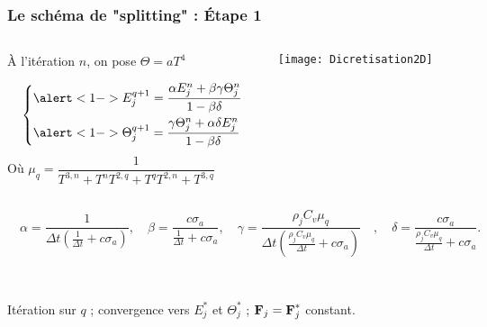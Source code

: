 \begin{frame}
  \frametitle{Le schéma de "splitting" : Étape 1}
  \begin{columns}
    \begin{column}{0.5\textwidth}
     À l'itération $n$, on pose $\Theta = aT^4$

      \begingroup
      \normalsize
      \begin{equation*} 
        \begin{dcases}
         \alert<1->{E_j^{q+1} = \dfrac{\alpha E_j^n + \beta \gamma \Theta_j^n}{1 - \beta \delta}} \\
         \alert<1->{\Theta_j^{q+1} = \dfrac{\gamma \Theta_j^n + \alpha \delta E_j^n}{1 - \beta \delta}}
        \end{dcases}
    \label{eqn:Step1}
    \end{equation*}
      \endgroup
      Où
      \tiny
      $\mu_q = \dfrac{1}{T^{3,n} + T^{n}T^{2,q} + T^{q}T^{2,n} + T^{3,q}}$
      \normalsize
    \end{column}
    \begin{column}{0.5\textwidth}
       \begin{center}
        \texttt{[image: Dicretisation2D]}       
       \end{center}
    \end{column}
   \end{columns}
   \tiny
  $\quad  \alpha = \dfrac{1}{\Delta t \left( \frac{1}{\Delta t} + c \sigma_a \right)} ,\quad 
   \beta = \dfrac{c \sigma_a}{\frac{1}{\Delta t} + c \sigma_a} ,\quad 
   \gamma = \dfrac{\rho_j C_v \mu_q}{\Delta t \left( \frac{\rho_j C_v \mu_q}{\Delta t} + c \sigma_a \right)} \quad , \quad  
   \delta = \dfrac{c \sigma_a}{\frac{\rho_j C_v \mu_q}{\Delta t} + c \sigma_a}.$

   \normalsize
   \begin{columns}
    \begin{column}{1.0\textwidth} 
      \\
      Itération sur $q$ ; convergence vers $E_j^*$ et $\Theta_j^*$ ; $\textbf{F}_j = \textbf{F}_j^*$ constant.
    \end{column}
    \begin{column}{0.0\textwidth} 
    \end{column}
  \end{columns}
   
\end{frame}


